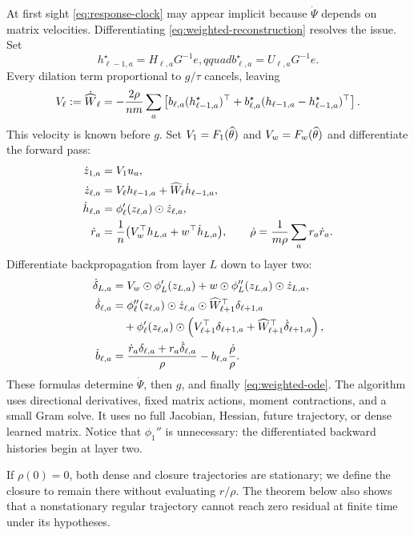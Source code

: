 At first sight \eqref{eq:response-clock} may appear implicit because
$\dot\Psi$ depends on matrix velocities.  Differentiating
\eqref{eq:weighted-reconstruction} resolves the issue.  Set
\begin{equation}
 h_{\ell-1,a}^\star=H_{\ell,a}G^{-1}e,qquad
 b_{\ell,a}^\star=U_{\ell,a}G^{-1}e.
\end{equation}
Every dilation term proportional to $g/\tau$ cancels, leaving
\begin{equation}
 V_\ell:=\dot{\widehat W}_\ell
 =-\frac{2\rho}{nm}\sum_a\left[
 b_{\ell,a}(h_{\ell-1,a}^\star)^\top
 +b_{\ell,a}^\star(h_{\ell-1,a}-h_{\ell-1,a}^\star)^\top
 \right].
 \label{eq:physical-velocity}
\end{equation}
This velocity is known before $g$.  Set $V_1=F_1(\widehat\theta)$ and
$V_w=F_w(\widehat\theta)$ and differentiate the forward pass:
\begin{align}
\dot z_{1,a}&=V_1u_a,\nonumber\\
\dot z_{\ell,a}&=V_\ell h_{\ell-1,a}
                    +\widehat W_\ell\dot h_{\ell-1,a},\nonumber\\
\dot h_{\ell,a}&=\phi_\ell'(z_{\ell,a})\odot\dot z_{\ell,a},\nonumber\\
\dot r_a&=\frac1n\bigl(V_w^\top h_{L,a}+w^\top\dot h_{L,a}\bigr),
\qquad
\dot\rho=\frac1{m\rho}\sum_a r_a\dot r_a.
\label{eq:directional-forward}
\end{align}
Differentiate backpropagation from layer $L$ down to layer two:
\begin{align}
\dot\delta_{L,a}
 &=V_w\odot\phi_L'(z_{L,a})
  +w\odot\phi_L''(z_{L,a})\odot\dot z_{L,a},\nonumber\\
\dot\delta_{\ell,a}
 &=\phi_\ell''(z_{\ell,a})\odot\dot z_{\ell,a}
       \odot\widehat W_{\ell+1}^\top\delta_{\ell+1,a}\nonumber\\
 &\quad+\phi_\ell'(z_{\ell,a})\odot
  \left(V_{\ell+1}^\top\delta_{\ell+1,a}
       +\widehat W_{\ell+1}^\top\dot\delta_{\ell+1,a}\right),\nonumber\\
\dot b_{\ell,a}
 &=\frac{\dot r_a\delta_{\ell,a}+r_a\dot\delta_{\ell,a}}{\rho}
   -b_{\ell,a}\frac{\dot\rho}{\rho}.
\label{eq:directional-backward}
\end{align}
These formulas determine $\dot\Psi$, then $g$, and finally
\eqref{eq:weighted-ode}.  The algorithm uses directional derivatives, fixed
matrix actions, moment contractions, and a small Gram solve.  It uses no full
Jacobian, Hessian, future trajectory, or dense learned matrix.  Notice that
$\phi_1''$ is unnecessary: the differentiated backward histories begin at
layer two.

If $\rho(0)=0$, both dense and closure trajectories are stationary; we define
the closure to remain there without evaluating $r/\rho$.  The theorem below
also shows that a nonstationary regular trajectory cannot reach zero residual
at finite time under its hypotheses.

